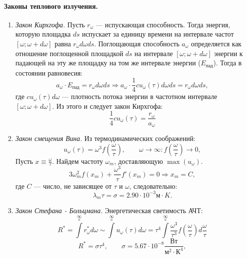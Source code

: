 \documentclass[__minimum__.tex]{subfiles}
\begin{document}
\paragraph{Законы теплового излучения.}
\begin{enumerate}
  \item
        \emph{Закон Кирхгофа.} Пусть $r_{\omega}$ --- испускающая способность. Тогда энергия, которую площадка $ds$ испускает за единицу времени на интервале частот $[\omega; \omega+d\omega]$ равна $r_\omega d\omega ds$. Поглощающая способность $a_\omega$ определяется как отношение поглощенной площадкой $ds$ на интервале $[\omega;\omega+d\omega]$ энергии к падающей на эту же площадку на том же интервале энергии ($E_{\text{пад}}$). Тогда в состоянии равновесия:
        $$
          a_\omega \cdot E_{\text{пад}} = r_\omega d\omega ds \Longrightarrow a_\omega\cdot \frac{1}{4}cu_\omega(\tau)d\omega ds = r_\omega d\omega ds,
        $$
        где $cu_\omega(\tau)d\omega$ --- плотность потока энергии в частотном интервале $[\omega; \omega+d\omega]$. Из этого и следует закон Кирхгофа:
        $$
          \frac{1}{4}cu_\omega(\tau)=\frac{r_\omega}{a_\omega}
        $$
  \item
        \emph{Закон смещения Вина.} Из термодинамических соображений:
        $$
          u_\omega(\tau)=\omega^3f\left(\frac{\omega}{\tau}\right),
          \qquad
          \omega\rightarrow\infty
          \colon
          f\left(\frac{\omega}{\tau}\right)\rightarrow{0},
        $$
        Пусть $x\equiv \frac{\omega}{\tau}$. Найдем частоту $\omega_m$, доставляющую $\max(u_\omega)$.
        $$
          3\omega_m^2f(x_m)+\frac{\omega^3}{\tau}f'(x_m)=0 \Longrightarrow x_m=C,
        $$
        где $C$ --- число, не зависящее от $\tau$ и $\omega$, следовательно:
        $$
          \lambda_m\tau=\sigma=2.90\cdot 10^{-3}\text{м}\cdot K.
        $$
  \item
        \emph{Закон Стефана - Больцмана.} Энергетическая светимость АЧТ:
        $$
          R^*=\int\limits^{\infty}\limits_0 r^*_\omega d\omega \sim \int\limits^{\infty}\limits_0 u_\omega(\tau)d\omega =\tau^4 \int\limits^{\infty}\limits_0 \frac{\omega^3}{\tau^3}f\left(\frac{\omega}{\tau}\right)d\frac{\omega}{\tau}
        $$
        $$
          R^*=\sigma \tau^4,
          \qquad
          \sigma = 5.67\cdot 10^{-8} \frac{\text{Вт}}{\text{м}^2\cdot\text{К}^4},
        $$
\end{enumerate}
\end{document}

